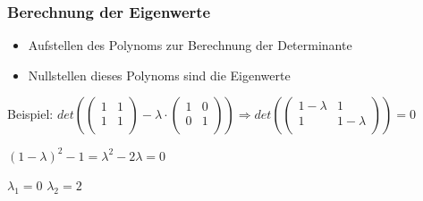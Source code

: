 \begin{frame}
    \frametitle{Berechnung der Eigenwerte}
    \begin{itemize}
        \item Aufstellen des Polynoms zur Berechnung der Determinante
        \item Nullstellen dieses Polynoms sind die Eigenwerte
    \end{itemize}
    Beispiel:
    $det(\begin{pmatrix}
        1 & 1 \\
        1 & 1 \\
    \end{pmatrix} - \lambda \cdot \begin{pmatrix}
        1 & 0 \\
        0 & 1 \\
    \end{pmatrix}) \Rightarrow det(\begin{pmatrix}
        1- \lambda & 1 \\
        1 & 1- \lambda \\
    \end{pmatrix}) = 0$

    $(1- \lambda)^2 - 1 = \lambda ^2 - 2 \lambda = 0 $
    \newline
    
    $\lambda _{1} = 0 $
    \newline
    $\lambda _{2} = 2$

\end{frame}

